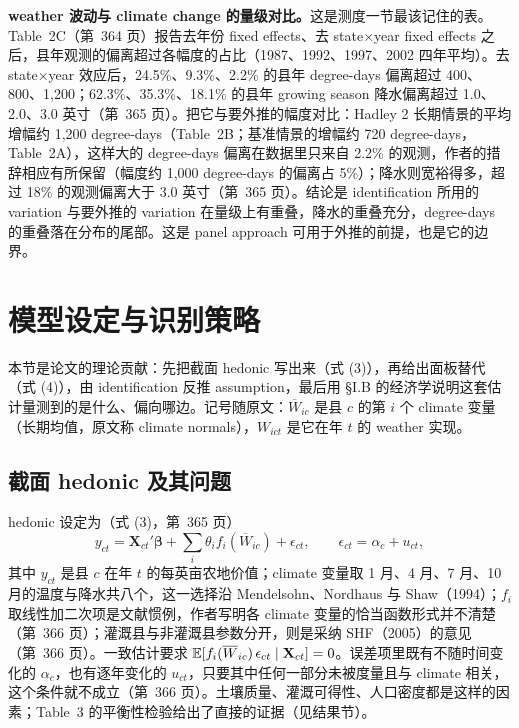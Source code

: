 \textbf{weather 波动与 climate change 的量级对比。}这是测度一节最该记住的表。Table~2C（第~364 页）报告去年份 fixed effects、去 state$\times$year fixed effects 之后，县年观测的偏离超过各幅度的占比（1987、1992、1997、2002 四年平均）。去 state$\times$year 效应后，24.5\%、9.3\%、2.2\% 的县年 degree-days 偏离超过 400、800、1{,}200；62.3\%、35.3\%、18.1\% 的县年 growing season 降水偏离超过 1.0、2.0、3.0 英寸（第~365 页）。把它与要外推的幅度对比：Hadley 2 长期情景的平均增幅约 1{,}200 degree-days（Table~2B；基准情景的增幅约 720 degree-days，Table~2A），这样大的 degree-days 偏离在数据里只来自 2.2\% 的观测，作者的措辞相应有所保留（幅度约 1{,}000 degree-days 的偏离占 5\%）；降水则宽裕得多，超过 18\% 的观测偏离大于 3.0 英寸（第~365 页）。结论是 identification 所用的 variation 与要外推的 variation 在量级上有重叠，降水的重叠充分，degree-days 的重叠落在分布的尾部。这是 panel approach 可用于外推的前提，也是它的边界。

\section{模型设定与识别策略}

本节是论文的理论贡献：先把截面 hedonic 写出来（式 (3)），再给出面板替代（式 (4)），由 identification 反推 assumption，最后用 \S I.B 的经济学说明这套估计量测到的是什么、偏向哪边。记号随原文：$\overline{W}_{ic}$ 是县 $c$ 的第 $i$ 个 climate 变量（长期均值，原文称 climate normals），$W_{ict}$ 是它在年 $t$ 的 weather 实现。

\subsection{截面 hedonic 及其问题}

hedonic 设定为（式 (3)，第~365 页）
\begin{equation}
y_{ct} = \mathbf{X}_{ct}'\boldsymbol{\beta} + \sum_i \theta_i f_i(\overline{W}_{ic}) + \epsilon_{ct},
\qquad \epsilon_{ct} = \alpha_c + u_{ct},
\label{eq:dg-hedonic}
\end{equation}
其中 $y_{ct}$ 是县 $c$ 在年 $t$ 的每英亩农地价值；climate 变量取 1 月、4 月、7 月、10 月的温度与降水共八个，这一选择沿 Mendelsohn、Nordhaus 与 Shaw（1994）；$f_i$ 取线性加二次项是文献惯例，作者写明各 climate 变量的恰当函数形式并不清楚（第~366 页）；灌溉县与非灌溉县参数分开，则是采纳 SHF（2005）的意见（第~366 页）。一致估计要求 $\mathbb{E}[f_i(\overline{W}_{ic})\,\epsilon_{ct}\mid \mathbf{X}_{ct}]=0$。误差项里既有不随时间变化的 $\alpha_c$，也有逐年变化的 $u_{ct}$，只要其中任何一部分未被度量且与 climate 相关，这个条件就不成立（第~366 页）。土壤质量、灌溉可得性、人口密度都是这样的因素；Table~3 的平衡性检验给出了直接的证据（见结果节）。


